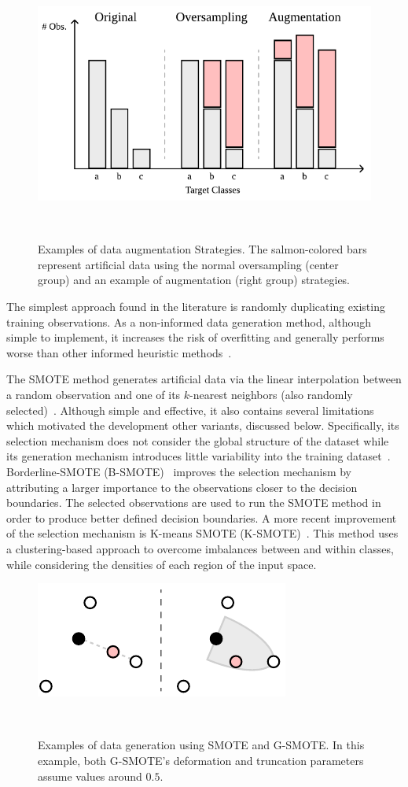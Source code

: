 \documentclass[parskip=full]{scrartcl}
\begin{document}
\begin{figure}[H]
	\centering
	\includegraphics[width=.6\linewidth]{../analysis/augmentation_strategies}
    \caption{%
        Examples of data augmentation Strategies. The salmon-colored bars
        represent artificial data using the normal oversampling (center group) and
        an example of augmentation (right group) strategies.
    }~\label{fig:augmentation_strategies}
\end{figure}

The simplest approach found in the literature is randomly duplicating existing
training observations. As a non-informed data generation method, although
simple to implement, it increases the risk of overfitting and generally
performs worse than other informed heuristic
methods~\cite{Douzas2019imbalanced}.

The SMOTE method generates artificial data via the linear interpolation
between a random observation and one of its $k$-nearest neighbors (also
randomly selected)~\cite{Chawla2002}. Although simple and effective, it also
contains several limitations which motivated the development other variants,
discussed below. Specifically, its selection mechanism does not consider the
global structure of the dataset while its generation mechanism introduces
little variability into the training dataset~\cite{Douzas2019}.
Borderline-SMOTE (B-SMOTE)~\cite{Han2005} improves the selection mechanism by
attributing a larger importance to the observations closer to the decision
boundaries. The selected observations are used to run the SMOTE method in
order to produce better defined decision boundaries. A more recent improvement
of the selection mechanism is K-means SMOTE (K-SMOTE)~\cite{Douzas2018}. This
method uses a clustering-based approach to overcome imbalances between and
within classes, while considering the densities of each region of the input
space.

\begin{figure}[H]
	\centering
	\includegraphics[width=.45\linewidth]{../analysis/smote_vs_gsmote}
    \caption{%
        Examples of data generation using SMOTE and G-SMOTE\@. In this
        example, both G-SMOTE's deformation and truncation parameters assume
        values around $0.5$.
    }~\label{fig:smote_vs_gsmote}
\end{figure}
\end{document}
